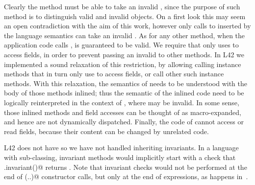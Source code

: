 Clearly the \Q@invariant@ method must be able to take an invalid \Q@this@, since the purpose of such method is to distinguish valid and invalid objects.
On a first look this may seem an open contradiction
with the aim of this work, however only calls to \Q@invariant@ inserted by the language semantics can take an invalid \Q@this@. As for any other method, when the application code calls \Q@invariant@,
\Q@this@ is guaranteed to be valid.
We require that \Q@invariant@
only uses \Q@this@ to access fields,
in order to prevent passing an invalid \Q@this@ to other methods.
In L42 we implemented a sound relaxation of this restriction, by allowing calling instance methods that in turn only use \Q@this@ to access fields, or call other such instance methods. With this relaxation, the semantics of \Q@invariant@ needs to be understood with the body of those methods inlined; thus the semantic of the inlined code need to be logically reinterpreted in the context of \Q@invariant@, where \Q@this@ may be invalid.
In some sense, those inlined methods and field accesses can be thought of as macro-expanded, and hence are not dynamically dispatched. 
Finally, the code of \Q@invariant@ cannot access \Q@mut@ or read fields, because their content can be changed by unrelated code.



L42 does not have \Q@extends@ so we have not handled inheriting invariants.
In a language with sub-classing, invariant methods would implicitly start with a check that \Q@super.invariant()@ returns \Q@true@.
Note that invariant checks would not be performed at the end of \Q@super(..)@ constructor calls, but only at the end of \Q@new@ expressions, as happens in~\cite{feldman2006jose}.





